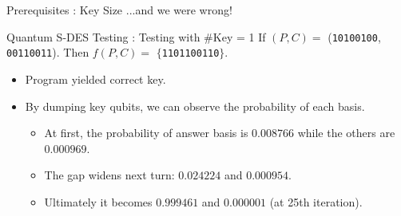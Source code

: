 \documentclass{beamer}
\begin{document}
    \begin{frame}{Prerequisites : Key Size}
        ...and we were wrong!
    \end{frame}
       
   	\begin{frame}{Quantum S-DES Testing : Testing with \#Key = 1}
        If $ (P, C) =$ (\texttt{10100100}, \texttt{00110011}). Then $ f(P, C) = $  $\{$\texttt{1101100110}$\}$.
        \begin{itemize}
            \item Program yielded correct key.
            \item By dumping key qubits, we can observe the probability of each basis.
            \begin{itemize}
                \item At first, the probability of answer basis is $ 0.008766 $ while the others are $ 0.000969 $.
                \item The gap widens next turn: $ 0.024224 $ and $ 0.000954 $.
                \item Ultimately it becomes $ 0.999461 $ and $ 0.000001 $ (at 25th iteration).
            \end{itemize}
        \end{itemize}
   	\end{frame} 
       
\end{document}
